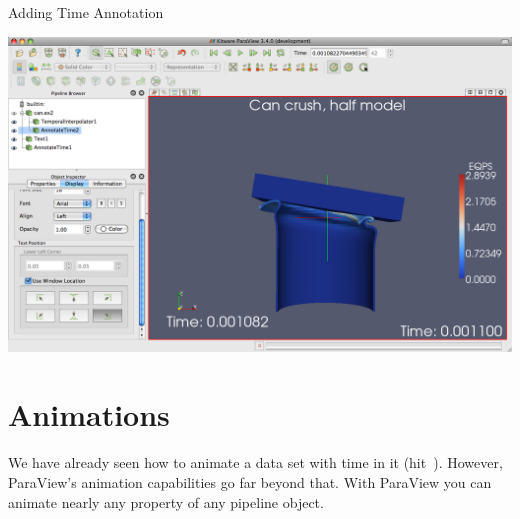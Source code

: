 \begin{exercise}{Adding Time Annotation}
  \begin{inlinefig}
    \includegraphics[width=\scw]{images/AnnotateTimeFilter}
  \end{inlinefig}
\end{exercise}


\section{Animations}

We have already seen how to animate a data set with time in it
(hit~\vcrPlay).  However, ParaView’s animation capabilities go far beyond
that.  With ParaView you can animate nearly any property of any pipeline
object.

